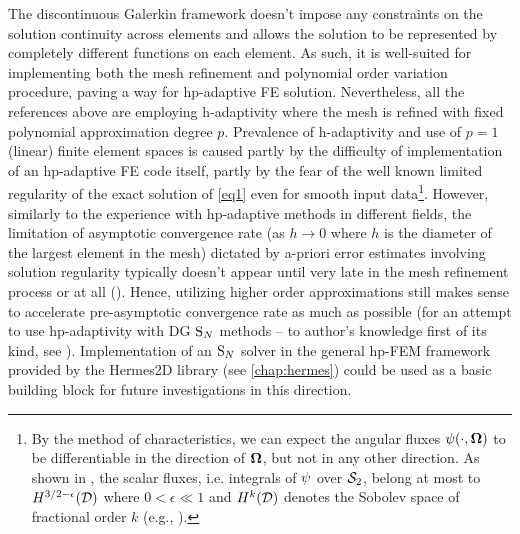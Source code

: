 {The discontinuous Galerkin framework doesn't impose any constraints on the solution
continuity across elements and allows the solution to be represented by completely different functions on each element.
As such, it is well-suited for implementing both the mesh refinement and polynomial order variation procedure, paving a
way for hp-adaptive FE solution.
Nevertheless, all the references above are employing h-adaptivity where the mesh is refined with fixed polynomial
approximation degree $p$. Prevalence of h-adaptivity and use of $p=1$ (linear) finite element spaces is caused partly
by the difficulty of implementation of an hp-adaptive FE code itself, partly by the fear of the well known limited
regularity of the exact solution of \eqref{eq1} even for smooth input data\footnote{By the method of characteristics, we
can expect the angular fluxes $\psi(\cdot,\mathbf{\Omega})$ to be differentiable in the direction of $\mathbf{\Omega}$, but not in
any other direction. As shown in \cite{Johnson}, the scalar fluxes, i.e. integrals of $\psi$ over $\mathcal{S}_2$, belong
at most to $H^{3/2-\epsilon}(\mathcal{D})$ where $0 < \epsilon \ll 1$ and $H^{k}(\mathcal{D})$ denotes the Sobolev space of fractional
order $k$ (e.g., \cite[Sec. 9.2]{demkowicz}).}.
However, similarly to the experience with hp-adaptive methods in different fields, the limitation of asymptotic
convergence rate (as $h\to 0$ where $h$ is the diameter of the largest element in the mesh) dictated by a-priori error
estimates involving solution regularity typically doesn't appear until very late in the mesh refinement process or at
all (\cite{wang2009convergence}). Hence, utilizing higher order approximations still makes sense to accelerate
pre-asymptotic convergence rate as much as possible (for an attempt to use hp-adaptivity with DG $\text{S}_{N}$ methods -- to
author's knowledge first of its kind, see \cite{FournierDGHP}). Implementation of an $\text{S}_{N}$ solver in the general hp-FEM
framework provided by the Hermes2D library (see \cref{chap:hermes}) could be used as a basic building block for future
investigations in this direction.
}
